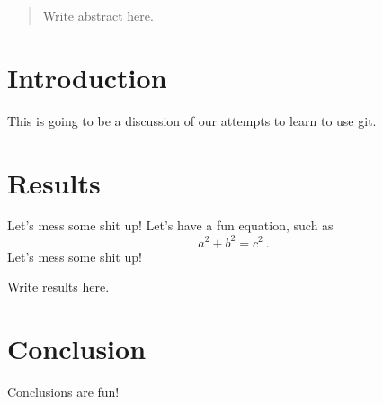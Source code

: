\documentclass{article}
\begin{document}
\begin{abstract}
Write abstract here.
\end{abstract}

\section{Introduction}

This is going to be a discussion of our attempts to learn to use git.

\section{Results}

Let's mess some shit up!
Let's have a fun equation, such as
\begin{equation}
a^2 + b^2 = c^2~.
\end{equation}
Let's mess some shit up!

Write results here.

\section{Conclusion}

Conclusions are fun!
\end{document}

